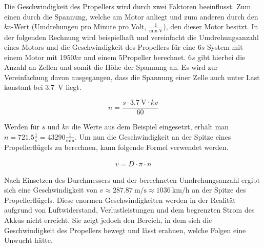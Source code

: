         Die Geschwindigkeit des Propellers wird durch zwei Faktoren beeinflusst. Zum einen durch die Spannung, welche am Motor anliegt und zum anderen durch den $kv$-Wert (Umdrehungen pro Minute pro Volt, $\frac{1}{\si{\minute}\cdot \si{\volt}}$), den dieser Motor besitzt. In der folgenden Rechnung wird beispielhaft und vereinfacht die Umdrehungsanzahl eines Motors und die Geschwindigkeit des Propellers für eine 6$s$ System mit einem Motor mit 1950$kv$ und einem 5\dq Propeller berechnet. 6$s$ gibt hierbei die Anzahl an Zellen und somit die Höhe der Spannung an. Es wird zur Vereinfachung davon ausgegangen, dass die Spannung einer Zelle auch unter Last konstant bei \qty{3,7}{\volt} liegt.
    
        \begin{equation}
            n=\frac{s\cdot\qty{3,7}{\volt}\cdot kv}{60}
        \end{equation}

        Werden für $s$ und $kv$ die Werte aus dem Beispiel eingesetzt, erhält man $n=\num{721,5} \frac{1}{\si{\second}} = \num{43290} \frac{1}{\si{\minute}}$. Um nun die Geschwindigkeit an der Spitze eines Propellerflügels zu berechnen, kann folgende Formel verwendet werden.
        
        \begin{align}
            v=D\cdot \pi \cdot n
        \end{align}

        Nach Einsetzen des Durchmessers und der berechneten Umdrehungsanzahl ergibt sich eine Geschwindigkeit von $v\approx \qty{287,87}{\meter\per\second} \approx \qty{1036}{\kilo\meter\per\hour}$ an der Spitze des Propellerflügels. Diese enormen Geschwindigkeiten werden in der Realität aufgrund von Luftwiderstand, Verlustleistungen und dem begrenzten Strom des Akkus nicht erreicht. Sie zeigt jedoch den Bereich, in dem sich die Geschwindigkeit des Propellers bewegt und lässt erahnen, welche Folgen eine Unwucht hätte.